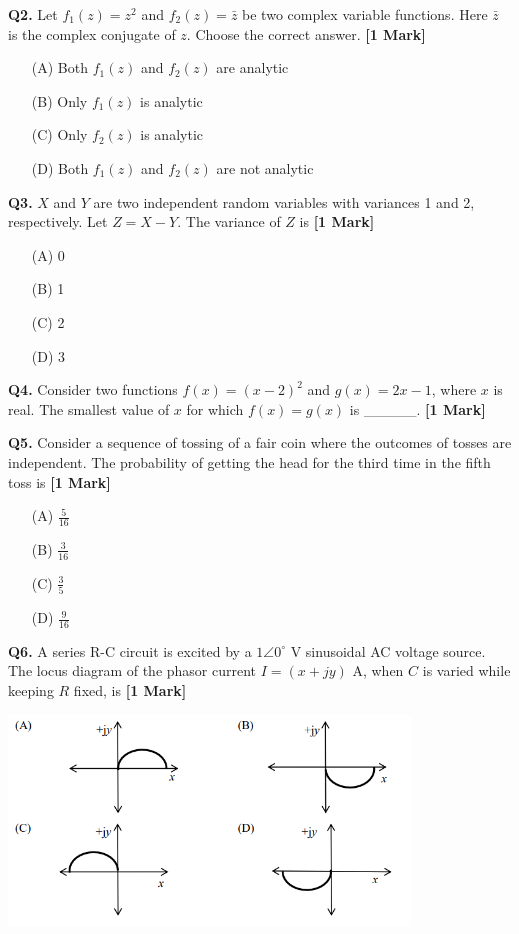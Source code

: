 \documentclass[11pt]{article}
\newcommand{\questiona}[2]{
    \noindent\textbf{Q#2.} #1 \hfill \textbf{[1 Mark]}
}
\begin{document}
\questiona{Let \(f_1(z) = z^2\) and \(f_2(z) = \bar{z}\) be two complex variable functions. Here \(\bar{z}\) is the complex conjugate of \(z\). Choose the correct answer.}{2}
\begin{enumerate}
    \item[(A)] Both \(f_1(z)\) and \(f_2(z)\) are analytic
    \item[(B)] Only \(f_1(z)\) is analytic
    \item[(C)] Only \(f_2(z)\) is analytic
    \item[(D)] Both \(f_1(z)\) and \(f_2(z)\) are not analytic
\end{enumerate}
\vspace{0.5cm}

\questiona{\(X\) and \(Y\) are two independent random variables with variances 1 and 2, respectively. Let \(Z = X - Y\). The variance of \(Z\) is}{3}
\begin{enumerate}
    \item[(A)] 0
    \item[(B)] 1
    \item[(C)] 2
    \item[(D)] 3
\end{enumerate}
\vspace{0.5cm}

\questiona{Consider two functions \(f(x) = (x - 2)^2\) and \(g(x) = 2x - 1\), where \(x\) is real. The smallest value of \(x\) for which \(f(x) = g(x)\) is \_\_\_\_\_.}{4}
\vspace{0.5cm}

\questiona{Consider a sequence of tossing of a fair coin where the outcomes of tosses are independent. The probability of getting the head for the third time in the fifth toss is}{5}
\begin{enumerate}
    \item[(A)] \(\frac{5}{16}\)
    \item[(B)] \(\frac{3}{16}\)
    \item[(C)] \(\frac{3}{5}\)
    \item[(D)] \(\frac{9}{16}\)
\end{enumerate}
\vspace{0.5cm}

\questiona{A series R-C circuit is excited by a \(1\angle 0^\circ\) V sinusoidal AC voltage source. The locus diagram of the phasor current \(I = (x + jy)\) A, when \(C\) is varied while keeping \(R\) fixed, is}{6}
\begin{center}
\includegraphics[width=0.8\textwidth]{figures/6.png}
\end{center}
\end{document}
